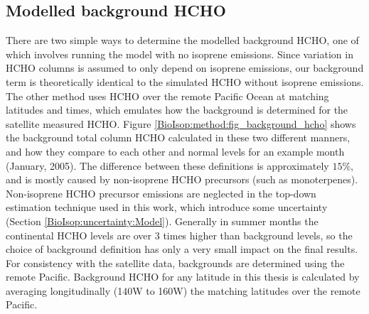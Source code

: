 
    
    
    
  \subsection{Modelled background HCHO}
    
    There are two simple ways to determine the modelled background HCHO, one of which involves running the model with no isoprene emissions. 
    Since variation in HCHO columns is assumed to only depend on isoprene emissions, our background term is theoretically identical to the simulated HCHO without isoprene emissions.
    The other method uses HCHO over the remote Pacific Ocean at matching latitudes and times, which emulates how the background is determined for the satellite measured HCHO.
    Figure \ref{BioIsop:method:fig_background_hcho} shows the background total column HCHO calculated in these two different manners, and how they compare to each other and normal levels for an example month (January, 2005).
    The difference between these definitions is approximately $15\%$, and is mostly caused by non-isoprene HCHO precursors (such as monoterpenes).
    Non-isoprene HCHO precursor emissions are neglected in the top-down estimation technique used in this work, which introduce some uncertainty (Section \ref{BioIsop:uncertainty:Model}).
    Generally in summer months the continental HCHO levels are over 3 times higher than background levels, so the choice of background definition has only a very small impact on the final results.
    For consistency with the satellite data, backgrounds are determined using the remote Pacific.
    Background HCHO for any latitude in this thesis is calculated by averaging longitudinally (140\degr W to 160\degr W) the matching latitudes over the remote Pacific.
    
